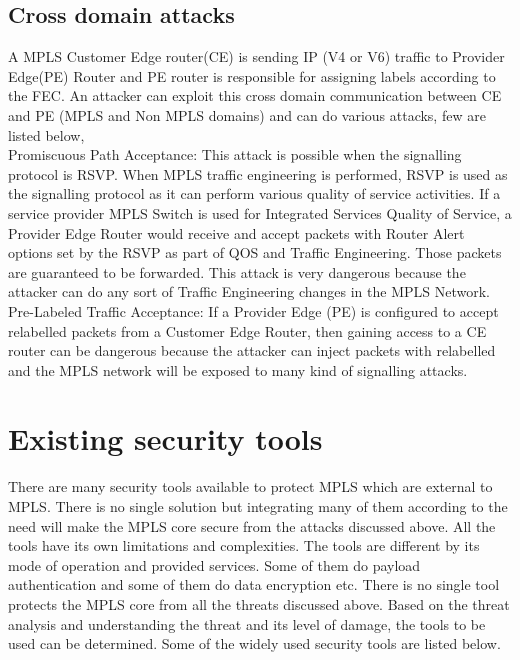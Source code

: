\subsection{Cross domain attacks}  

A MPLS Customer Edge router(CE) is sending IP (V4 or V6) traffic to Provider Edge(PE) Router and PE router is responsible for assigning labels according to the FEC. An attacker can exploit this cross domain communication between CE and PE (MPLS and Non MPLS domains) and can do various attacks, few are listed below,\\


    Promiscuous Path Acceptance: This attack is possible when the signalling protocol is RSVP. When MPLS traffic engineering is performed, RSVP is used as the signalling protocol as it can perform various quality of service activities. If a service provider MPLS Switch is used for Integrated Services Quality of Service, a Provider Edge Router would receive and accept packets with Router Alert options set by the RSVP as part of QOS and Traffic Engineering. Those packets are guaranteed to be forwarded. This attack is very dangerous because the attacker can do any sort of Traffic Engineering changes in the MPLS Network.\\

    Pre-Labeled Traffic Acceptance: If a Provider Edge (PE) is configured to accept relabelled packets from a Customer Edge Router, then gaining access to a CE router can be dangerous because the attacker can inject packets with relabelled and the MPLS network will be exposed to many kind of signalling attacks.\\
    
\section{Existing security tools}

There are many security tools available to protect MPLS\cite{bănuță_2012} which are external to MPLS. There is no single solution but integrating many of them according to the need will make the MPLS core secure from the attacks discussed above. All the tools have its own limitations and complexities. The tools are different by its mode of operation and provided services. Some of them do payload authentication and some of them do data encryption etc. There is no single tool protects the MPLS core from all the threats discussed above. Based on the threat analysis and understanding the threat and its level of damage, the tools to be used can be determined. Some of the widely used security tools are listed below. 

